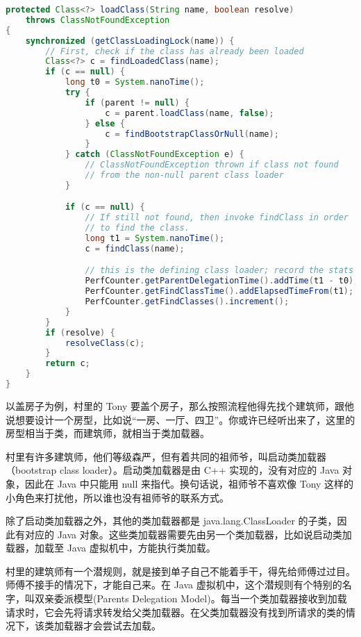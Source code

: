 \documentclass[../../../interview-questions.tex]{subfiles}
\begin{document}
\begin{lstlisting}[language=Java]
protected Class<?> loadClass(String name, boolean resolve)
    throws ClassNotFoundException
{
    synchronized (getClassLoadingLock(name)) {
        // First, check if the class has already been loaded
        Class<?> c = findLoadedClass(name);
        if (c == null) {
            long t0 = System.nanoTime();
            try {
                if (parent != null) {
                    c = parent.loadClass(name, false);
                } else {
                    c = findBootstrapClassOrNull(name);
                }
            } catch (ClassNotFoundException e) {
                // ClassNotFoundException thrown if class not found
                // from the non-null parent class loader
            }

            if (c == null) {
                // If still not found, then invoke findClass in order
                // to find the class.
                long t1 = System.nanoTime();
                c = findClass(name);

                // this is the defining class loader; record the stats
                PerfCounter.getParentDelegationTime().addTime(t1 - t0);
                PerfCounter.getFindClassTime().addElapsedTimeFrom(t1);
                PerfCounter.getFindClasses().increment();
            }
        }
        if (resolve) {
            resolveClass(c);
        }
        return c;
    }
}
\end{lstlisting}

以盖房子为例，村里的 Tony 要盖个房子，那么按照流程他得先找个建筑师，跟他说想要设计一个房型，比如说“一房、一厅、四卫”。你或许已经听出来了，这里的房型相当于类，而建筑师，就相当于类加载器。

村里有许多建筑师，他们等级森严，但有着共同的祖师爷，叫启动类加载器（bootstrap class loader）。启动类加载器是由 C++ 实现的，没有对应的 Java 对象，因此在 Java 中只能用 null 来指代。换句话说，祖师爷不喜欢像 Tony 这样的小角色来打扰他，所以谁也没有祖师爷的联系方式。

除了启动类加载器之外，其他的类加载器都是 java.lang.ClassLoader 的子类，因此有对应的 Java 对象。这些类加载器需要先由另一个类加载器，比如说启动类加载器，加载至 Java 虚拟机中，方能执行类加载。

村里的建筑师有一个潜规则，就是接到单子自己不能着手干，得先给师傅过过目。师傅不接手的情况下，才能自己来。在 Java 虚拟机中，这个潜规则有个特别的名字，叫双亲委派模型(Parents Delegation Model)。每当一个类加载器接收到加载请求时，它会先将请求转发给父类加载器。在父类加载器没有找到所请求的类的情况下，该类加载器才会尝试去加载。
\end{document}
